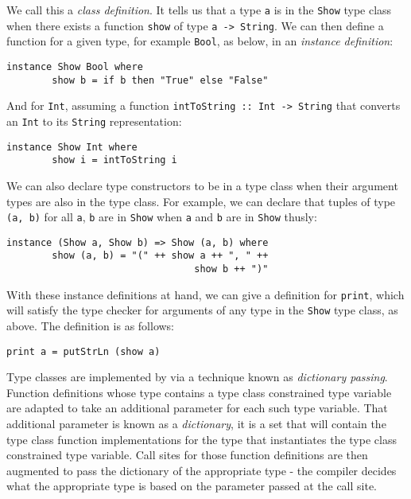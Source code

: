 \noindent We call this a \emph{class definition}. It tells us that a type
\texttt{a} is in the \texttt{Show} type class when there exists a function
\texttt{show} of type \texttt{a -> String}. We can then define a function for a
given type, for example \texttt{Bool}, as below, in an \emph{instance
definition}:
\begin{lstlisting}[mathescape]
    instance Show Bool where
        show b = if b then "True" else "False"
\end{lstlisting}

\noindent And for \texttt{Int}, assuming a function \texttt{intToString :: Int
-> String} that converts an \texttt{Int} to its \texttt{String} representation:
\begin{lstlisting}[mathescape]
    instance Show Int where
        show i = intToString i
\end{lstlisting}

\noindent We can also declare type constructors to be in a type class when their
argument types are also in the type class. For example, we can declare that
tuples of type \texttt{(a, b)} for all \texttt{a}, \texttt{b} are in
\texttt{Show} when \texttt{a} and \texttt{b} are in \texttt{Show} thusly:
\begin{lstlisting}[mathescape]
    instance (Show a, Show b) => Show (a, b) where
        show (a, b) = "(" ++ show a ++ ", " ++
                                 show b ++ ")"
\end{lstlisting}

\noindent With these instance definitions at hand, we can give a definition for
\texttt{print}, which will satisfy the type checker for arguments of any type in
the \texttt{Show} type class, as above. The definition is as follows:
\begin{lstlisting}[mathescape]
    print a = putStrLn (show a)
\end{lstlisting}

Type classes are implemented by via a technique known as \emph{dictionary
passing}. Function definitions whose type contains a type class constrained type
variable are adapted to take an additional parameter for each such type
variable. That additional parameter is known as a \emph{dictionary}, it is a set
that will contain the type class function implementations for the type that
instantiates the type class constrained type variable. Call sites for those
function definitions are then augmented to pass the dictionary of the
appropriate type - the compiler decides what the appropriate type is based on
the parameter passed at the call site.

